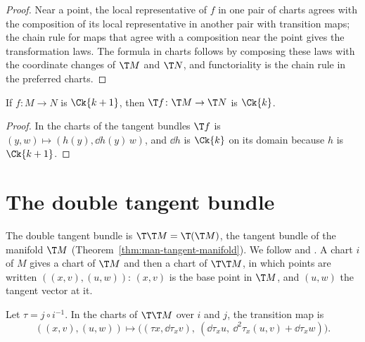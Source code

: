 \begin{proof}
  \leanok
  Near a point, the local representative of $f$ in one pair of charts agrees with the
  composition of its local representative in another pair with transition maps; the chain rule for maps that agree with a composition near the point gives
  the transformation laws. The formula in charts follows by composing these laws with the
  coordinate changes of $\T M$ and $\T N$, and functoriality is the chain rule in the preferred
  charts.
\end{proof}

\begin{theorem}
  \label{thm:man-tangent-map-smooth}
  \leanok
  If $f \colon M \to N$ is $\Ck{k+1}$, then $\T f \colon \T M \to \T N$ is $\Ck{k}$.
\end{theorem}

\begin{proof}
  \leanok
  In the charts of the tangent bundles $\T f$ is $(y, w) \mapsto (h(y), \dd h(y)\,w)$, and
  $\dd h$ is $\Ck{k}$ on its domain because $h$ is $\Ck{k+1}$.
\end{proof}

\section{The double tangent bundle}

The double tangent bundle is $\T\T M = \T(\T M)$, the tangent bundle of the manifold $\T M$
(Theorem~\ref{thm:man-tangent-manifold}). We follow \cite[Cap.~5]{Lar26} and \cite[\S
IV.3]{Lan99}. A chart $i$ of $M$ gives a chart of $\T M$ and then a chart of $\T\T M$, in which
points are written $((x, v), (u, w))$: $(x, v)$ is the base point in $\T M$, and $(u, w)$ the
tangent vector at it.

\begin{theorem}
  \label{thm:man-double-transition}
  \leanok
  Let $\tau = j \circ i^{-1}$. In the charts of $\T\T M$ over $i$ and $j$, the transition map is
  \[
    ((x, v), (u, w)) \longmapsto \bigl((\tau x, \dd\tau_x v),\ (\dd\tau_x u,\ \dd^2\tau_x(u, v)
    + \dd\tau_x w)\bigr).
  \]
\end{theorem}

